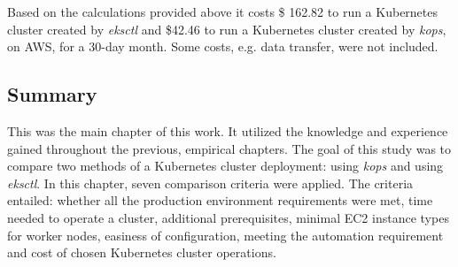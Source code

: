 Based on the calculations provided above it costs \$ 162.82 to run a Kubernetes cluster created by \textit{eksctl} and \$42.46 to run a Kubernetes cluster created by \textit{kops}, on AWS, for a 30-day month. Some costs, e.g. data transfer, were not included.




\subsection{Summary}

This was the main chapter of this work. It utilized the knowledge and experience gained throughout the previous, empirical chapters. The goal of this study was to compare two methods of a Kubernetes cluster deployment: using \textit{kops} and using \textit{eksctl}. In this chapter,  seven comparison criteria were applied. The criteria entailed: whether all the production environment requirements were met, time needed to operate a cluster, additional prerequisites, minimal EC2 instance types for worker nodes, easiness of configuration, meeting the automation requirement and cost of chosen Kubernetes cluster operations.

